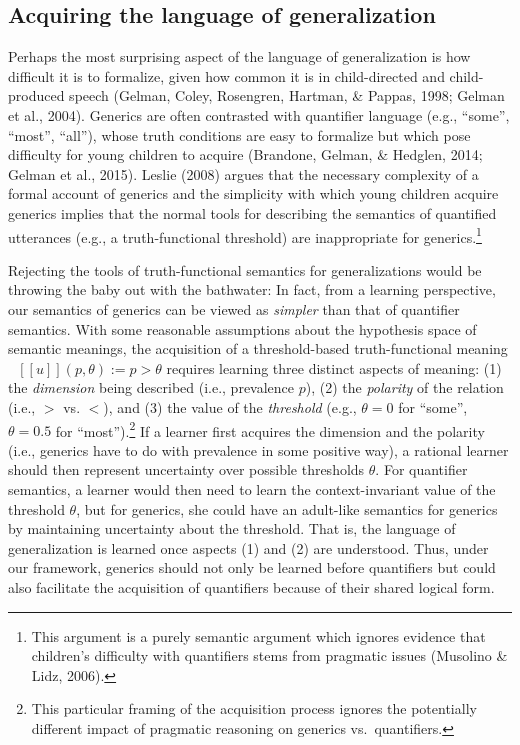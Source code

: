 \documentclass[english,,man,floatsintext]{apa6}
\let\rmarkdownfootnote\footnote%
\def\footnote{\protect\rmarkdownfootnote}
\theoremstyle{definition}
\theoremstyle{definition}
\theoremstyle{definition}
\theoremstyle{remark}
\begin{document}
\hypertarget{acquiring-the-language-of-generalization}{%
\subsection{Acquiring the language of
generalization}\label{acquiring-the-language-of-generalization}}

Perhaps the most surprising aspect of the language of generalization is
how difficult it is to formalize, given how common it is in
child-directed and child-produced speech (Gelman, Coley, Rosengren,
Hartman, \& Pappas, 1998; Gelman et al., 2004). Generics are often
contrasted with quantifier language (e.g., \enquote{some},
\enquote{most}, \enquote{all}), whose truth conditions are easy to
formalize but which pose difficulty for young children to acquire
(Brandone, Gelman, \& Hedglen, 2014; Gelman et al., 2015). Leslie (2008)
argues that the necessary complexity of a formal account of generics and
the simplicity with which young children acquire generics implies that
the normal tools for describing the semantics of quantified utterances
(e.g., a truth-functional threshold) are inappropriate for
generics.\footnote{This argument is a purely semantic argument which
  ignores evidence that children's difficulty with quantifiers stems
  from pragmatic issues (Musolino \& Lidz, 2006).}

Rejecting the tools of truth-functional semantics for generalizations
would be throwing the baby out with the bathwater: In fact, from a
learning perspective, our semantics of generics can be viewed as
\emph{simpler} than that of quantifier semantics. With some reasonable
assumptions about the hypothesis space of semantic meanings, the
acquisition of a threshold-based truth-functional meaning
\(\mbox{ $[\![ u ]\!]$}(p, \theta) := p > \theta\) requires learning
three distinct aspects of meaning: (1) the \emph{dimension} being
described (i.e., prevalence \(p\)), (2) the \emph{polarity} of the
relation (i.e., \(>\) vs. \(<\)), and (3) the value of the
\emph{threshold} (e.g., \(\theta = 0\) for \enquote{some},
\(\theta = 0.5\) for \enquote{most}).\footnote{This particular framing
  of the acquisition process ignores the potentially different impact of
  pragmatic reasoning on generics vs.~quantifiers. } If a learner first
acquires the dimension and the polarity (i.e., generics have to do with
prevalence in some positive way), a rational learner should then
represent uncertainty over possible thresholds \(\theta\). For
quantifier semantics, a learner would then need to learn the
context-invariant value of the threshold \(\theta\), but for generics,
she could have an adult-like semantics for generics by maintaining
uncertainty about the threshold. That is, the language of generalization
is learned once aspects (1) and (2) are understood. Thus, under our
framework, generics should not only be learned before quantifiers but
could also facilitate the acquisition of quantifiers because of their
shared logical form.
\end{document}
